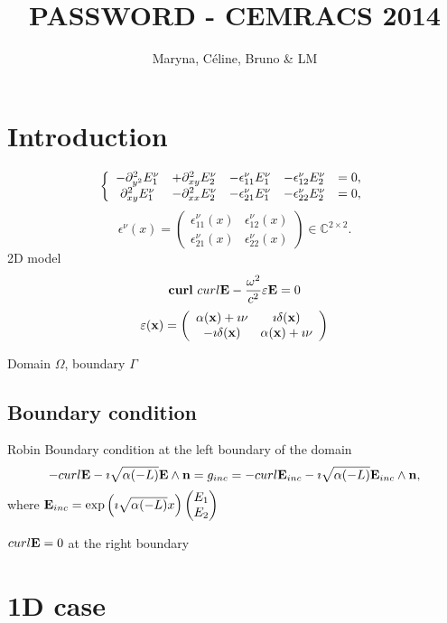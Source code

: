 \documentclass{article}
\title{PASSWORD - CEMRACS 2014}
\author{Maryna, C\'eline, Bruno \& LM}
\date{}
\newcommand{\bs}{\left\{}
\newcommand{\es}{\right.}
\newcommand{\ba}{\begin{array}}
\newcommand{\ea}{\end{array}}
\newcommand{\be}{\begin{equation}}
\newcommand{\ee}{\end{equation}}
\newcommand{\x}{{\bf x}}
\newcommand{\E}{{\bf E}}
\newcommand{\n}{{\bf n}}
\newcommand{\eps}{{\bf \varepsilon}}
\begin{document}
\maketitle


\section{Introduction}


\begin{equation} \label{eq:00}
\bs
\ba{ccccc}
-\partial^2_{y^2}E_{1}^\nu & +\partial^2_{xy}E_{2}^\nu & -\epsilon_{11}^\nu
 E_{1}^\nu & -\epsilon_{12}^\nu E_{2}^\nu & =0, \cr
\partial^2_{xy}E_{1}^\nu & -\partial^2_{xx}E_{2}^\nu & -\epsilon_{21}
^\nu
E_{1}^\nu & -\epsilon_{22}^\nu E_{2}^\nu & =0,
\ea
\es
\end{equation}
\be \label{eq:epsilonmu}
 \epsilon^\nu(x) =
\left(
\begin{array}{cc}
\epsilon_{11} ^\nu(x)& \epsilon_{12} ^\nu(x)\\
\epsilon_{21}^\nu(x) & \epsilon_{22}^\nu(x)
\end{array}
\right)
\in \mathbb C^{2\times 2}
.
\ee
2D model
\be
{\bf curl} \ curl \E - \frac{\omega^2}{c^2} \varepsilon \E= 0
\ee
\be
\eps (\x)= 
\left(
\begin{array}{cc}
\alpha(\x) + \imath \nu& \imath \delta (\x)\\
-\imath \delta (\x) & \alpha(\x) +\imath \nu
\end{array}
\right)
\ee

Domain $\Omega$, boundary $\Gamma$

\subsection{Boundary condition}
Robin Boundary condition at the left boundary of the domain
\be
-curl \E -\imath \sqrt{\alpha(-{ L})}\E \wedge \n = g_{inc} = -curl \E_{inc} -\imath \sqrt{\alpha(-{ L})}\E_{inc} \wedge \n,
\ee
where  $\E_{inc} = \exp \left(\imath \sqrt{\alpha(-L)}x\right)\begin{pmatrix} E_1\\ E_2 \end{pmatrix}$

$curl \E = 0$ at the right boundary


\section{1D case}
\end{document}
